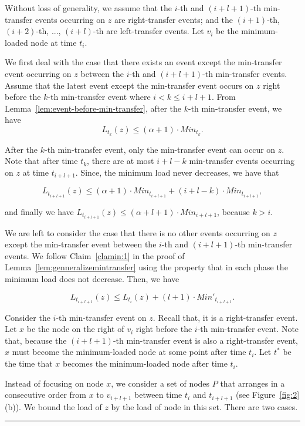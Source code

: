 \documentclass[a4paper]{article}
\newenvironment{proof}{{\bf Proof:}}{\hfill\rule{1.5mm}{3mm}\vspace{0.1in}}
\begin{document}
\begin{proof}
  Without loss of generality, we assume that the $i$-th and 
  $(i+l+1)$-th min-transfer events occurring on $z$ are 
  right-transfer events; and the $(i+1)$-th, $(i+2)$-th,
  ..., $(i+l)$-th are  left-transfer events. Let $v_{i}$ be the
  minimum-loaded node at time $t_i$.
 
  We first deal with the case that there exists an event except the
  min-transfer event occurring on $z$ between the $i$-th and
   $(i+l+1)$-th min-transfer events. Assume that the latest
  event except the min-transfer event occurs on $z$ right before the
  $k$-th min-transfer event where $i<k\leq i+l+1$. From
  Lemma~\ref{lem:event-before-min-transfer}, after the $k$-th
  min-transfer event, we have
  \[L_{t_k}(z)\leq(\alpha + 1)\cdot Min_{t_k}.\]
  
  After the $k$-th min-transfer event, only the
  min-transfer event can occur on $z$.  Note that after time $t_k$,
  there are at most $i+l-k$ min-transfer events occurring on $z$ at
  time $t_{i+l+1}$. Since, the minimum load never decreases, we have
  that
  
  \[
  L_{t_{i+l+1}}(z) \leq (\alpha+1)\cdot Min_{t_{i+l+1}} + (i+l-k)\cdot
  Min_{t_{i+l+1}},
  \]

  and finally we have $L_{t_{i+l+1}}(z)\leq (\alpha+l+1)\cdot
  Min_{i+l+1}$, because $k> i$.
  
  We are left to consider the case that there is no other events
  occurring on $z$ except the min-transfer event between the $i$-th
  and $(i+l+1)$-th min-transfer events. We follow Claim~\ref{clamin:1} in the proof
  of Lemma~\ref{lem:genneralizemintransfer} using the property that in
  each phase the minimum load does not decrease. Then, we have
  
  \begin{equation}\label{eqn:5}
    L_{t_{i+l+1}}(z) \leq L_{t_{i}}(z) + (l+1)\cdot
    Min'_{t_{i+l+1}}.
  \end{equation}

  Consider the $i$-th min-transfer event on $z$. Recall that, it is a
  right-transfer event. Let $x$ be the node on the right of $v_i$
  right before the $i$-th min-transfer event.  Note
  that, because the $(i+l+1)$-th min-transfer event is also
  a right-transfer event, $x$ must become the minimum-loaded
  node at some point after time $t_i$.  Let $t^*$ be the time that $x$ becomes the minimum-loaded
  node after time $t_i$.
 
  Instead of focusing on node $x$, we consider a set of nodes $P$
  that arranges in a consecutive order from $x$ to $v_{i+l+1}$ between
  time $t_i$ and $t_{i+l+1}$ (see Figure~\ref{fig:2} (b)). We 
  bound the load of $z$ by the load of node in this set. There are two
  cases.


\end{proof}
\end{document}
